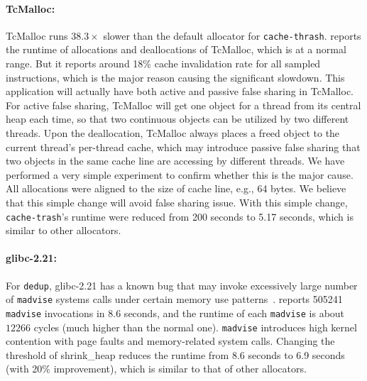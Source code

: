 
\paragraph{TcMalloc:}
TcMalloc runs $38.3\times$ slower than the default allocator for \texttt{cache-thrash}. \MP{} reports the runtime of allocations and deallocations of TcMalloc, which is at a normal range. But it reports around 18\% cache invalidation rate for all sampled instructions, which is the major reason causing the significant slowdown. This application will actually have both active and passive false sharing in TcMalloc. 
For active false sharing, TcMalloc will get one object for a thread from its central heap each time, so that two continuous objects can be utilized by two different threads. Upon the deallocation, TcMalloc always places a freed object to the current thread's per-thread cache, which may introduce passive false sharing that two objects in the same cache line are accessing by different threads. We have performed a very simple experiment to confirm whether this is the major cause. All allocations were aligned to the size of cache line, e.g., 64 bytes. We believe that this simple change will avoid false sharing issue. With this simple change, \texttt{cache-trash}'s runtime were reduced from 200 seconds to 5.17 seconds, which is similar to other allocators. 

\paragraph{glibc-2.21:}  For \texttt{dedup}, glibc-2.21 has a known bug that may invoke excessively large number of \texttt{madvise} systems calls under certain memory use patterns~\cite{madvise}. \MP{} reports 505241 \texttt{madvise} invocations in 8.6 seconds, and the runtime of each \texttt{madvise} is about $12266$ cycles (much higher than the normal one). \texttt{madvise} introduces high kernel contention with page faults and memory-related system calls. Changing the threshold of shrink\_heap reduces the runtime from 8.6 seconds to 6.9 seconds (with 20\% improvement), which is similar to that of other allocators.


